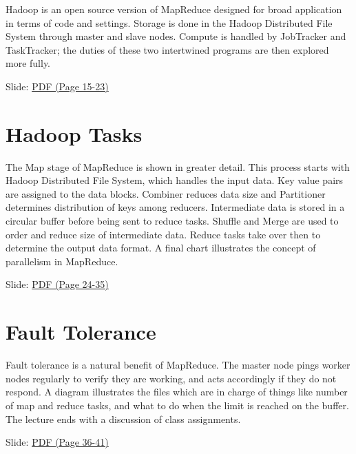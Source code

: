 Hadoop is an open source version of MapReduce designed for broad
application in terms of code and settings. Storage is done in the Hadoop
Distributed File System through master and slave nodes. Compute is
handled by JobTracker and TaskTracker; the duties of these two
intertwined programs are then explored more fully.


  Slide:
  \href{https://drive.google.com/open?id=0B88HKpainTSfMnpCelpNQUpNdVE}{PDF
  (Page 15-23)}

\section{Hadoop Tasks}

The Map stage of MapReduce is shown in greater detail. This process
starts with Hadoop Distributed File System, which handles the input
data. Key value pairs are assigned to the data blocks. Combiner reduces
data size and Partitioner determines distribution of keys among
reducers. Intermediate data is stored in a circular buffer before being
sent to reduce tasks. Shuffle and Merge are used to order and reduce
size of intermediate data. Reduce tasks take over then to determine the
output data format. A final chart illustrates the concept of parallelism
in MapReduce.


  Slide:
  \href{https://drive.google.com/open?id=0B88HKpainTSfMnpCelpNQUpNdVE}{PDF
  (Page 24-35)}

\section{Fault Tolerance}

Fault tolerance is a natural benefit of MapReduce. The master node pings
worker nodes regularly to verify they are working, and acts accordingly
if they do not respond. A diagram illustrates the files which are in
charge of things like number of map and reduce tasks, and what to do
when the limit is reached on the buffer. The lecture ends with a
discussion of class assignments.


  Slide:
  \href{https://drive.google.com/open?id=0B88HKpainTSfMnpCelpNQUpNdVE}{PDF
  (Page 36-41)}

